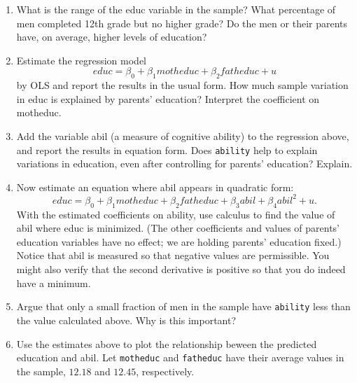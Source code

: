 \documentclass[]{article}
\providecommand{\tightlist}{%
  \setlength{\itemsep}{0pt}\setlength{\parskip}{0pt}}
\begin{document}
\begin{enumerate}
\def\labelenumi{\arabic{enumi}.}
\tightlist
\item
  What is the range of the educ variable in the sample? What percentage
  of men completed 12th grade but no higher grade? Do the men or their
  parents have, on average, higher levels of education?
\item
  Estimate the regression model
  \[educ=\beta_0+\beta_1 motheduc+\beta_2 fatheduc+u\] by OLS and report
  the results in the usual form. How much sample variation in educ is
  explained by parents' education? Interpret the coefficient on
  motheduc.
\item
  Add the variable abil (a measure of cognitive ability) to the
  regression above, and report the results in equation form. Does
  \texttt{ability} help to explain variations in education, even after
  controlling for parents' education? Explain.
\item
  Now estimate an equation where abil appears in quadratic form:
  \[educ=\beta_0+\beta_1 motheduc+\beta_2 fatheduc+\beta_3 abil+\beta_4{abil}^2+u.\]
  With the estimated coefficients on ability, use calculus to find the
  value of abil where educ is minimized. (The other coefficients and
  values of parents' education variables have no effect; we are holding
  parents' education fixed.) Notice that abil is measured so that
  negative values are permissible. You might also verify that the second
  derivative is positive so that you do indeed have a minimum.
\item
  Argue that only a small fraction of men in the sample have
  \texttt{ability} less than the value calculated above. Why is this
  important?
\item
  Use the estimates above to plot the relationship beween the predicted
  education and abil. Let \texttt{motheduc} and \texttt{fatheduc} have
  their average values in the sample, \(12.18\) and \(12.45\),
  respectively.
\end{enumerate}
\end{document}
